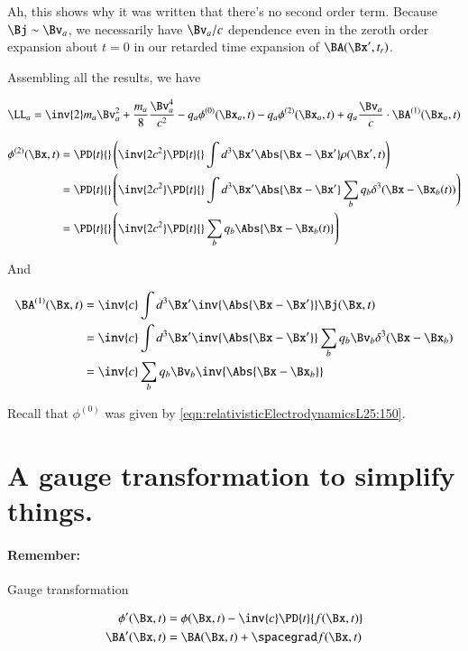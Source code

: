 Ah, this shows why it was written that there's no second order term.  Because $\Bj \sim \Bv_a$, we necessarily have $\Bv_a/c$ dependence even in the zeroth order expansion about $t=0$ in our retarded time expansion of $\BA(\Bx', t_r)$.

Assembling all the results, we have

\begin{equation}\label{eqn:relativisticElectrodynamicsL25:330}
\LL_a = \inv{2} m_a \Bv_a^2 + \frac{m_a}{8} \frac{\Bv_a^4}{c^2} - q_a \phi^{(0)}(\Bx_a, t) - q_a \phi^{(2)}(\Bx_a, t) + q_a \frac{\Bv_a}{c} \cdot \BA^{(1)}(\Bx_a, t)
\end{equation}

\begin{align*}
\phi^{(2)}(\Bx, t) 
&= \PD{t}{} \left( \inv{2 c^2} \PD{t}{} \int d^3 \Bx' \Abs{\Bx - \Bx'} \rho(\Bx', t) \right) \\
&= \PD{t}{} \left( \inv{2 c^2} \PD{t}{} \int d^3 \Bx' \Abs{\Bx - \Bx'} \sum_b q_b \delta^3(\Bx - \Bx_b(t)) \right) \\
&= \PD{t}{} \left( \inv{2 c^2} \PD{t}{} \sum_b q_b \Abs{\Bx - \Bx_b(t)} \right)
\end{align*}

And 

\begin{align*}
\BA^{(1)}(\Bx, t) 
&= \inv{c} \int d^3 \Bx' \inv{\Abs{\Bx - \Bx'}} \Bj(\Bx, t) \\
&= \inv{c} \int d^3 \Bx' \inv{\Abs{\Bx - \Bx'}} \sum_b q_b \Bv_b \delta^3(\Bx -\Bx_b) \\
&= \inv{c} \sum_b q_b \Bv_b \inv{\Abs{\Bx -\Bx_b}} \\
\end{align*}

Recall that $\phi^{(0)}$ was given by \ref{eqn:relativisticElectrodynamicsL25:150}.

\section{A gauge transformation to simplify things.}

\paragraph{Remember:} Gauge transformation

\begin{align}\label{eqn:relativisticElectrodynamicsL25:350}
\phi'(\Bx, t) &= \phi(\Bx, t) - \inv{c} \PD{t}{f(\Bx, t)} \\
\BA'(\Bx, t) &= \BA(\Bx, t) + \spacegrad f(\Bx, t) \\
\end{align}

